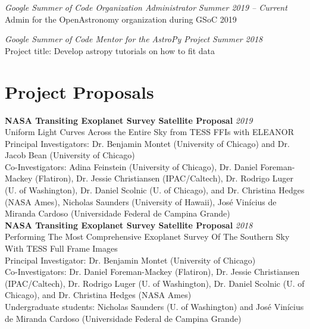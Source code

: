 \documentclass[10pt]{article}
\begin{document}
\begin{titlepage}
\emph{Google Summer of Code Organization Administrator} \hfill \textit{Summer 2019 -- Current}
\\Admin for the OpenAstronomy organization during GSoC 2019
\vspace{.5cm}

\emph{Google Summer of Code Mentor for the AstroPy Project} \hfill \textit{Summer 2018}
\\Project title: Develop astropy tutorials on how to fit data
\vspace{.5cm}


\section*{Project Proposals}
    \textbf{NASA Transiting Exoplanet Survey Satellite Proposal}
    \hfill \textit{2019}\\
    Uniform Light Curves Across the Entire Sky from TESS FFIs with ELEANOR\\
    {\small Principal Investigators: Dr. Benjamin Montet (University of Chicago) and Dr. Jacob Bean (University of Chicago)}\\
    {\small Co-Investigators: Adina Feinstein (University of Chicago), Dr. Daniel Foreman-Mackey (Flatiron),
    Dr. Jessie Christiansen (IPAC/Caltech), Dr. Rodrigo Luger (U. of Washington),
    Dr. Daniel Scolnic (U. of Chicago), and Dr. Christina Hedges (NASA Ames),
  Nicholas Saunders (University of Hawaii), Jos\'e Vin\'icius de Miranda Cardoso (Universidade Federal de Campina Grande)}\\

    \textbf{NASA Transiting Exoplanet Survey Satellite Proposal}
    \hfill \textit{2018}\\
    Performing The Most Comprehensive Exoplanet Survey Of The Southern Sky With TESS Full Frame Images\\
    {\small Principal Investigator: Dr. Benjamin Montet (University of Chicago)}\\
    {\small Co-Investigators: Dr. Daniel Foreman-Mackey (Flatiron), Dr. Jessie Christiansen (IPAC/Caltech),
    Dr. Rodrigo Luger (U. of Washington), Dr. Daniel Scolnic (U. of Chicago), and Dr. Christina Hedges (NASA Ames)}\\
    {\small Undergraduate students: Nicholas Saunders (U. of Washington) and
      Jos\'e Vin\'icius de Miranda Cardoso (Universidade Federal de Campina Grande)}


\end{titlepage}
\end{document}
